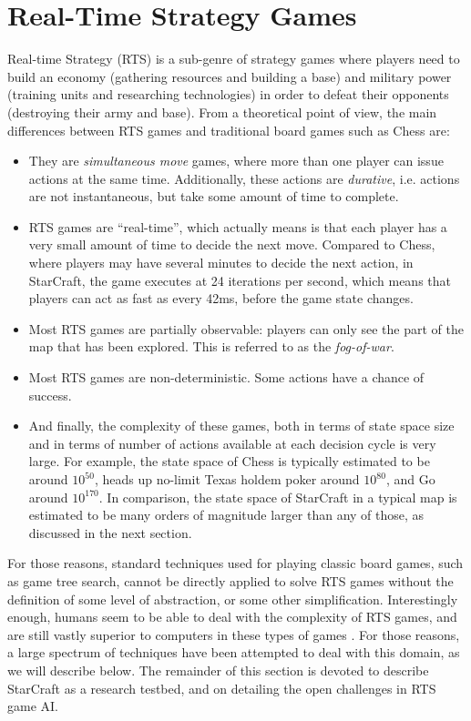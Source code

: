 \documentclass[journal]{IEEEtran}
\begin{document}

\section{Real-Time Strategy Games}\label{sec:rts}

Real-time Strategy (RTS) is a sub-genre of strategy games where players need to build an economy (gathering resources and building a base) and military power (training units and researching technologies) in order to defeat their opponents (destroying their army and base). From a theoretical point of view, the main differences between RTS games and traditional board games such as Chess are:

\begin{itemize}
\item They are {\em simultaneous move} games, where more than one player can issue actions at the same time. Additionally, these actions are {\em durative}, i.e. actions are not instantaneous, but take some amount of time to complete.
\item RTS games are ``real-time'', which actually means is that each player has a very small amount of time to decide the next move. Compared to Chess, where players may have several minutes to decide the next action, in StarCraft, the game executes at 24 iterations per second, which means that players can act as fast as every 42ms, before the game state changes.
\item Most RTS games are partially observable: players can only see the part of the map that has been explored. This is referred to as the {\em fog-of-war}.
\item Most RTS games are non-deterministic. Some actions have a chance of success.
\item And finally, the complexity of these games, both in terms of state space size and in terms of number of actions available at each decision cycle is very large. For example, the state space of Chess is typically estimated to be around $10^{50}$, heads up no-limit Texas holdem poker around $10^{80}$, and Go around $10^{170}$. In comparison, the state space of StarCraft in a typical map is estimated to be many orders of magnitude larger than any of those, as discussed in the next section.
\end{itemize}

For those reasons, standard techniques used for playing classic board games, such as game tree search, cannot be directly applied to solve RTS games without the definition of some level of abstraction, or some other simplification. Interestingly enough, humans seem to be able to deal with the complexity of RTS games, and are still vastly superior to computers in these types of games \cite{burochurchill2012aimagazine}. For those reasons, a large spectrum of techniques have been attempted to deal with this domain, as we will describe below. The remainder of this section is devoted to describe StarCraft as a research testbed, and on detailing the open challenges in RTS game AI.
\end{document}
